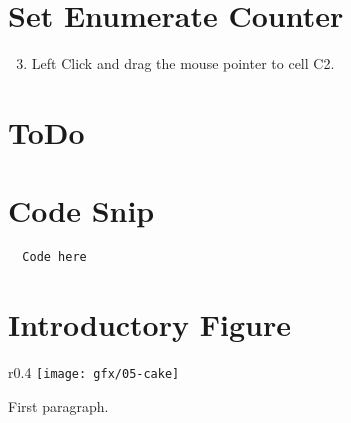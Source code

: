 \section{Set Enumerate Counter}
\begin{enumerate}
	\setcounter{enumi}{2} %
	
	\item Left Click and drag the mouse pointer to cell \textsf{C2}.
\end{enumerate}


\section{ToDo}

\section{Code Snip}
\begin{lstlisting}
  Code here
\end{lstlisting}

\section{Introductory Figure}

\begin{wrapfigure}{r}{0.4\textwidth}
	\centering
	\texttt{[image: gfx/05-cake]} 
\end{wrapfigure}

First paragraph.


